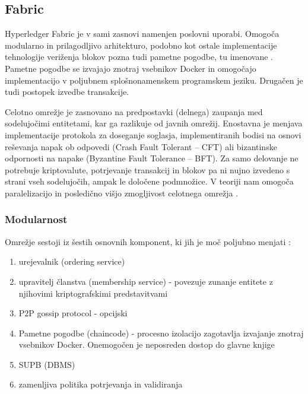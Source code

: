 \documentclass[a4paper, 12pt]{book}
\begin{document}
\subsection{Fabric}
Hyperledger Fabric je v sami zasnovi namenjen poslovni uporabi.
Omogoča modularno in prilagodljivo arhitekturo, podobno kot ostale implementacije tehnologije veriženja blokov pozna tudi pametne pogodbe, tu imenovane .
Pametne pogodbe se izvajajo znotraj vsebnikov Docker in omogočajo implementacijo v poljubnem splošnonamenskem programskem jeziku.
Drugačen je tudi postopek izvedbe transakcije.

Celotno omrežje je zasnovano na predpostavki (delnega) zaupanja med sodelujočimi entitetami, kar ga razlikuje od javnih omrežij.
Enostavna je menjava implementacije protokola za doseganje soglasja, implementiranih bodisi na osnovi reševanja napak ob odpovedi (Crash Fault Tolerant -- CFT) ali bizantinske odpornosti na napake (Byzantine Fault Tolerance -- BFT).
Za samo delovanje ne potrebuje kriptovalute, potrjevanje transakcij in blokov pa ni nujno izvedeno s strani vseh sodelujočih, ampak le določene podmnožice.
V teoriji nam omogoča paralelizacijo in posledično višjo zmogljivost celotnega omrežja \cite{hyperledgerDocs}.

\subsubsection{Modularnost}
Omrežje sestoji iz šestih osnovnih komponent, ki jih je moč poljubno menjati \cite{hyperledgerDocs}:
\begin{enumerate}
	\item urejevalnik (ordering service)
	\item upravitelj članstva (membership service) - povezuje zunanje entitete z njihovimi kriptografskimi predstavitvami
	\item P2P gossip protocol - opcijski
	\item Pametne pogodbe (chaincode) - procesno izolacijo zagotavlja izvajanje znotraj vsebnikov Docker. 
	Onemogočen je neposreden dostop do glavne knjige
	\item SUPB (DBMS)
	\item zamenljiva politika potrjevanja in validiranja
\end{enumerate}
\end{document}
